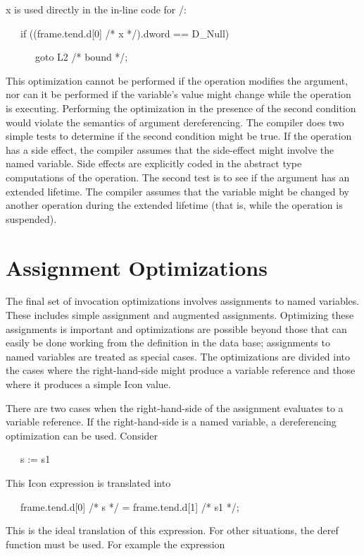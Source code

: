 x is used directly in the in-line code for /: 

{\ttfamily\mdseries
\ \ \ if ((frame.tend.d[0] /* x */).dword == D\_Null)}

{\ttfamily\mdseries
\ \ \ \ \ \ goto L2 /* bound */;}


This optimization cannot be performed if the operation modifies the
argument, nor can it be performed if the variable's value might change
while the operation is executing. Performing the optimization in the
presence of the second condition would violate the semantics of
argument dereferencing. The compiler does two simple tests to
determine if the second condition might be true. If the operation has
a side effect, the compiler assumes that the side-effect might involve
the named variable. Side effects are explicitly coded in the abstract
type computations of the operation. The second test is to see if the
argument has an extended lifetime. The compiler assumes that the
variable might be changed by another operation during the extended
lifetime (that is, while the operation is suspended).


\section{Assignment Optimizations}

The final set of invocation optimizations involves assignments to
named variables. These includes simple assignment and augmented
assignments. Optimizing these assignments is important and
optimizations are possible beyond those that can easily be done
working from the definition in the data base; assignments to named
variables are treated as special cases. The optimizations are divided
into the cases where the right-hand-side might produce a variable
reference and those where it produces a simple Icon value.


There are two cases when the right-hand-side of the assignment
evaluates to a variable reference. If the right-hand-side is a named
variable, a dereferencing optimization can be used. Consider

{\ttfamily\mdseries
\ \ \ s := s1}


This Icon expression is translated into 

{\ttfamily\mdseries
\ \ \ frame.tend.d[0] /* s */ = frame.tend.d[1] /* s1 */;}


This is the ideal translation of this expression. For other
situations, the deref function must be used. For example the
expression

